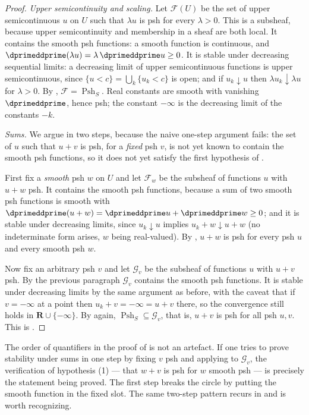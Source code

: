 \begin{proof}
\emph{Upper semicontinuity and scaling.}  Let $\mathscr F(U)$ be the set of
upper semicontinuous $u$ on $U$ such that $\lambda u$ is psh for every
$\lambda>0$.  This is a subsheaf, because upper semicontinuity and
membership in a sheaf are both local.  It contains the smooth psh functions:
a smooth function is continuous, and $\dprimeddprime(\lambda u)
=\lambda\,\dprimeddprime u\ge0$.  It is stable under decreasing sequential
limits: a decreasing limit of upper semicontinuous functions is upper
semicontinuous, since $\{u<c\}=\bigcup_k\{u_k<c\}$ is open; and if
$u_k\downarrow u$ then $\lambda u_k\downarrow\lambda u$ for $\lambda>0$.
By , $\mathscr F=\operatorname{Psh}_S$.  Real constants are smooth with vanishing $\dprimeddprime$, hence psh;
the constant $-\infty$ is the decreasing limit of the constants $-k$.

\emph{Sums.}  We argue in two steps, because the naive one-step argument
fails: the set of $u$ such that $u+v$ is psh, for a \emph{fixed} psh $v$, is
not yet known to contain the smooth psh functions, so it does not yet satisfy
the first hypothesis of .

First fix a \emph{smooth} psh $w$ on $U$ and let $\mathscr F_w$ be the
subsheaf of functions $u$ with $u+w$ psh.  It contains the smooth psh
functions, because a sum of two smooth psh functions is smooth with
$\dprimeddprime(u+w)=\dprimeddprime u+\dprimeddprime w\ge0$; and it is stable
under decreasing limits, since $u_k\downarrow u$ implies
$u_k+w\downarrow u+w$ (no indeterminate form arises, $w$ being real-valued).
By , $u+w$ is psh for every psh $u$ and every
smooth psh $w$.

Now fix an arbitrary psh $v$ and let $\mathscr G_v$ be the subsheaf of
functions $u$ with $u+v$ psh.  By the previous paragraph $\mathscr G_v$
contains the smooth psh functions.  It is stable under decreasing limits by
the same argument as before, with the caveat that if $v=-\infty$ at a point
then $u_k+v=-\infty=u+v$ there, so the convergence still holds in
$\mathbf R\cup\{-\infty\}$.  By  again,
$\operatorname{Psh}_S\subseteq\mathscr G_v$, that is, $u+v$ is psh for all psh
$u,v$.  This is \cite[Lemma~8.1.2]{CLD25}.
\end{proof}

\begin{remark}
\label{rem:ch15-two-step-sum}
The order of quantifiers in the proof of  is not an
artefact.  If one tries to prove stability under sums in one step by fixing
$v$ psh and applying  to $\mathscr G_v$, the
verification of hypothesis (1) --- that $w+v$ is psh for $w$ smooth psh ---
is precisely the statement being proved.  The first step breaks the circle by
putting the smooth function in the fixed slot.  The same two-step pattern
recurs in  and is worth recognizing.
\end{remark}

